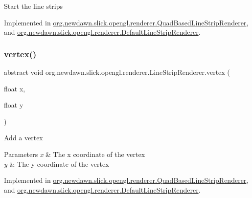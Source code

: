Start the line strips 

Implemented in \mbox{\hyperlink{classorg_1_1newdawn_1_1slick_1_1opengl_1_1renderer_1_1_quad_based_line_strip_renderer_a63893acff7cb6395fe2c941477a78e76}{org.\+newdawn.\+slick.\+opengl.\+renderer.\+Quad\+Based\+Line\+Strip\+Renderer}}, and \mbox{\hyperlink{classorg_1_1newdawn_1_1slick_1_1opengl_1_1renderer_1_1_default_line_strip_renderer_a6d1f2a49396c421d3ab71e6c472db291}{org.\+newdawn.\+slick.\+opengl.\+renderer.\+Default\+Line\+Strip\+Renderer}}.

\mbox{\label{interfaceorg_1_1newdawn_1_1slick_1_1opengl_1_1renderer_1_1_line_strip_renderer_a9051033674d28d26c5750155df2c5113}} 
\subsubsection{\texorpdfstring{vertex()}{vertex()}}
{\footnotesize\ttfamily abstract void org.\+newdawn.\+slick.\+opengl.\+renderer.\+Line\+Strip\+Renderer.\+vertex (\begin{DoxyParamCaption}\item[{float}]{x,  }\item[{float}]{y }\end{DoxyParamCaption})\hspace{0.3cm}{\ttfamily [abstract]}}

Add a vertex


\begin{DoxyParams}{Parameters}
{\em x} & The x coordinate of the vertex \\
\hline
{\em y} & The y coordinate of the vertex \\
\hline
\end{DoxyParams}


Implemented in \mbox{\hyperlink{classorg_1_1newdawn_1_1slick_1_1opengl_1_1renderer_1_1_quad_based_line_strip_renderer_ae2ae9cf57163887ab122d24fa29f066f}{org.\+newdawn.\+slick.\+opengl.\+renderer.\+Quad\+Based\+Line\+Strip\+Renderer}}, and \mbox{\hyperlink{classorg_1_1newdawn_1_1slick_1_1opengl_1_1renderer_1_1_default_line_strip_renderer_a61da8b730261c056d7ba8c00be607162}{org.\+newdawn.\+slick.\+opengl.\+renderer.\+Default\+Line\+Strip\+Renderer}}.

